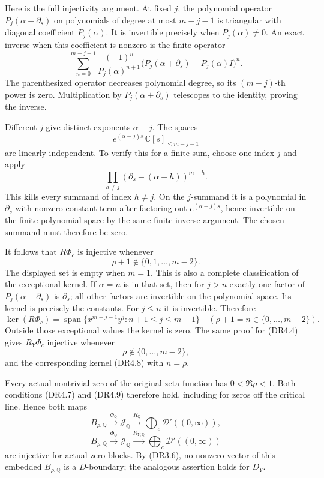 Here is the full injectivity argument. At fixed \(j\), the polynomial
operator \(P_j(\alpha+\partial_s)\) on polynomials of degree at most
\(m-j-1\) is triangular with diagonal coefficient \(P_j(\alpha)\). It is
invertible precisely when \(P_j(\alpha)\ne0\). An exact inverse when
this coefficient is nonzero is the finite operator \[
 \sum_{n=0}^{m-j-1}
    \frac{(-1)^n}{P_j(\alpha)^{n+1}}
       \bigl(P_j(\alpha+\partial_s)-P_j(\alpha)I\bigr)^n.
\tag{DR4.5}
\] The parenthesized operator decreases polynomial degree, so its
\((m-j)\)-th power is zero. Multiplication by \(P_j(\alpha+\partial_s)\)
telescopes to the identity, proving the inverse.

Different \(j\) give distinct exponents \(\alpha-j\). The spaces \[
 e^{(\alpha-j)s}\,\mathbb C[s]_{\le m-j-1}
\tag{DR4.6}
\] are linearly independent. To verify this for a finite sum, choose one
index \(j\) and apply \[
 \prod_{h\ne j}
       (\partial_s-(\alpha-h))^{m-h}.
\] This kills every summand of index \(h\ne j\). On the \(j\)-summand it
is a polynomial in \(\partial_s\) with nonzero constant term after
factoring out \(e^{(\alpha-j)s}\), hence invertible on the finite
polynomial space by the same finite inverse argument. The chosen summand
must therefore be zero.

It follows that \(R\Phi_c\) is injective whenever \[
 \rho+1\notin\{0,1,\ldots,m-2\}.
\tag{DR4.7}
\] The displayed set is empty when \(m=1\). This is also a complete
classification of the exceptional kernel. If \(\alpha=n\) is in that
set, then for \(j>n\) exactly one factor of \(P_j(\alpha+\partial_s)\)
is \(\partial_s\); all other factors are invertible on the polynomial
space. Its kernel is precisely the constants. For \(j\le n\) it is
invertible. Therefore \[
 \ker(R\Phi_c)
  =\operatorname{span}
        \{x^{m-j-1}y^j:n+1\le j\le m-1\}
       \quad(\rho+1=n\in\{0,\ldots,m-2\}).
\tag{DR4.8}
\] Outside those exceptional values the kernel is zero. The same proof
for (DR4.4) gives \(R_Y\Phi_c\) injective whenever \[
 \rho\notin\{0,\ldots,m-2\},
\tag{DR4.9}
\] and the corresponding kernel (DR4.8) with \(n=\rho\).

Every actual nontrivial zero of the original zeta function has
\(0<\Re\rho<1\). Both conditions (DR4.7) and (DR4.9) therefore hold,
including for zeros off the critical line. Hence both maps \[
 B_{\rho,\mathbb Q}\xrightarrow{\Phi_{\mathbb Q}}
 \mathcal J_{\mathbb Q}
 \xrightarrow{R_{\mathbb Q}}
       \bigoplus_c\mathcal D'((0,\infty)),
\] \[
 B_{\rho,\mathbb Q}\xrightarrow{\Phi_{\mathbb Q}}
 \mathcal J_{\mathbb Q}
 \xrightarrow{R_{Y,\mathbb Q}}
       \bigoplus_c\mathcal D'((0,\infty))
\tag{DR4.10}
\] are injective for actual zero blocks. By (DR3.6), no nonzero vector
of this embedded \(B_{\rho,\mathbb Q}\) is a \(D\)-boundary; the
analogous assertion holds for \(D_Y\).

